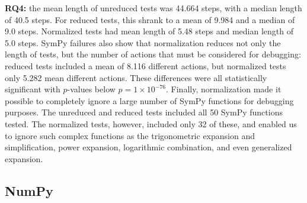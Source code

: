 {\bf RQ4:} the mean length of unreduced tests was 44.664 steps, with a median
length of 40.5 steps.  For reduced tests, this shrank to a mean of
9.984 and a median of 9.0 steps.  Normalized tests had mean length of
5.48 steps and median length of 5.0 steps.  SymPy failures also show
that normalization reduces not only the length of tests, but the number of
actions that must be considered for debugging:  reduced tests included
a mean of 8.116 different actions, but normalized tests only 5.282
mean different actions.  These differences were all statistically
significant with $p$-values below $p=1\times10^{-76}$.  Finally,
normalization made it possible to completely ignore a large number of
SymPy functions for debugging purposes.  The unreduced and reduced
tests included all 50 SymPy functions tested.  The normalized tests,
however, included only 32 of these, and enabled us to ignore such
complex functions as the trigonometric expansion and simplification, power expansion,
logarithmic combination, and even generalized expansion.

\subsection{NumPy}

